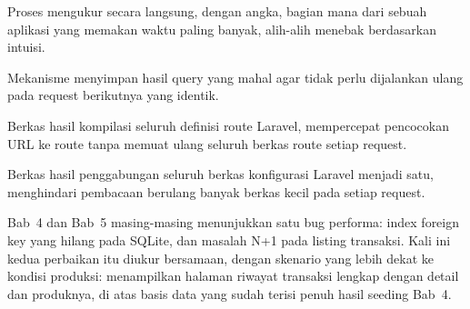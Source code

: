 \begin{istilahpenting}
\begin{description}[leftmargin=0pt,style=nextline]
  \item[Profiling] Proses mengukur secara langsung, dengan angka, bagian mana dari sebuah aplikasi yang memakan waktu paling banyak, alih-alih menebak berdasarkan intuisi.
  \item[Query Cache] Mekanisme menyimpan hasil query yang mahal agar tidak perlu dijalankan ulang pada request berikutnya yang identik.
  \item[Route Cache] Berkas hasil kompilasi seluruh definisi route Laravel, mempercepat pencocokan URL ke route tanpa memuat ulang seluruh berkas route setiap request.
  \item[Config Cache] Berkas hasil penggabungan seluruh berkas konfigurasi Laravel menjadi satu, menghindari pembacaan berulang banyak berkas kecil pada setiap request.
\end{description}
\end{istilahpenting}

Bab~4 dan Bab~5 masing-masing menunjukkan satu bug performa: index
foreign key yang hilang pada SQLite, dan masalah N+1 pada listing
transaksi. Kali ini kedua perbaikan itu diukur bersamaan, dengan skenario
yang lebih dekat ke kondisi produksi: menampilkan halaman riwayat
transaksi lengkap dengan detail dan produknya, di atas basis data yang
sudah terisi penuh hasil seeding Bab~4.

